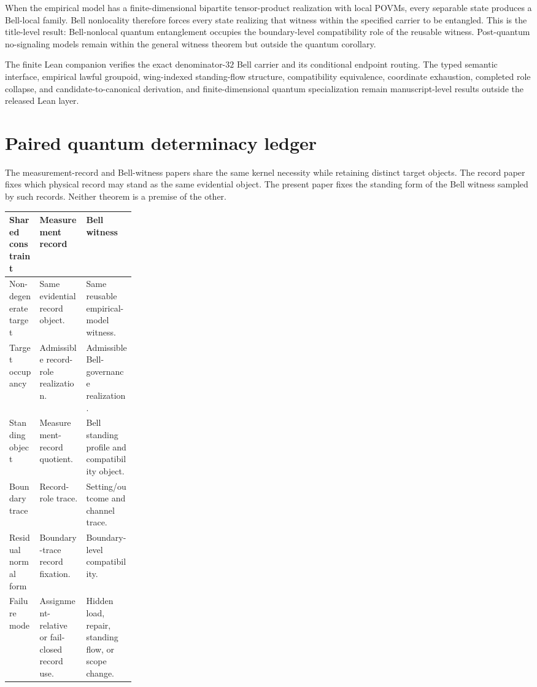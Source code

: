 \documentclass[11pt]{article}
\theoremstyle{definition}
\begin{document}
When the empirical model has a finite-dimensional bipartite tensor-product realization with local POVMs, every separable state produces a Bell-local family. Bell nonlocality therefore forces every state realizing that witness within the specified carrier to be entangled. This is the title-level result: Bell-nonlocal quantum entanglement occupies the boundary-level compatibility role of the reusable witness. Post-quantum no-signaling models remain within the general witness theorem but outside the quantum corollary.

The finite Lean companion verifies the exact denominator-$32$ Bell carrier and its conditional endpoint routing. The typed semantic interface, empirical lawful groupoid, wing-indexed standing-flow structure, compatibility equivalence, coordinate exhaustion, completed role collapse, and candidate-to-canonical derivation, and finite-dimensional quantum specialization remain manuscript-level results outside the released Lean layer.

\appendix

\section{Paired quantum determinacy ledger}\label{app:paired}
The measurement-record and Bell-witness papers share the same kernel necessity while retaining distinct target objects. The record paper fixes which physical record may stand as the same evidential object. The present paper fixes the standing form of the Bell witness sampled by such records. Neither theorem is a premise of the other.

\begin{center}
\footnotesize
\begin{tabularx}{0.96\linewidth}{L{0.24\linewidth}Y Y}
\toprule
\textbf{Shared constraint} & \textbf{Measurement record} & \textbf{Bell witness}\\
\midrule
Non-degenerate target & Same evidential record object. & Same reusable empirical-model witness.\\
Target occupancy & Admissible record-role realization. & Admissible Bell-governance realization.\\
Standing object & Measurement-record quotient. & Bell standing profile and compatibility object.\\
Boundary trace & Record-role trace. & Setting/outcome and channel trace.\\
Residual normal form & Boundary-trace record fixation. & Boundary-level compatibility.\\
Failure mode & Assignment-relative or fail-closed record use. & Hidden load, repair, standing flow, or scope change.\\
\bottomrule
\end{tabularx}
\end{center}
\end{document}
